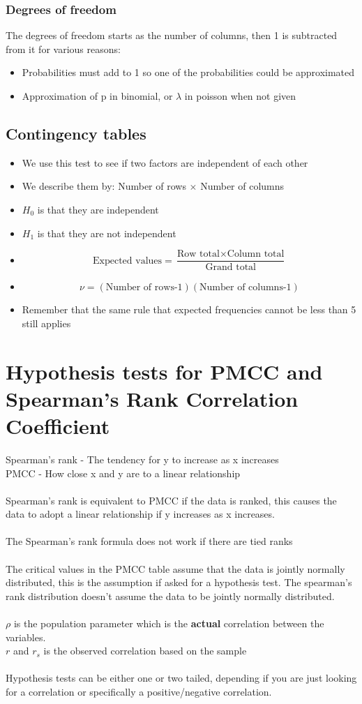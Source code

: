 \documentclass{article}[18pt]
\begin{document}
\subsubsection{Degrees of freedom}
The degrees of freedom starts as the number of columns, then 1 is subtracted from it for various reasons:
\begin{itemize}
\item Probabilities must add to 1 so one of the probabilities could be approximated
\item Approximation of p in binomial, or $\lambda$ in poisson when not given
\end{itemize}
\newpage
\subsection{Contingency tables}
\begin{itemize}
\item We use this test to see if two factors are independent of each other
\item We describe them by: Number of rows $\times$ Number of columns
\item $H_0$ is that they are independent
\item $H_1$ is that they are not independent
\item $$\textrm{Expected values}=\frac{\textrm{Row total}\times\textrm{Column total}}{\textrm{Grand total}}$$
\item $$\nu=(\textrm{Number of rows-1})(\textrm{Number of columns-1})$$
\item Remember that the same rule that expected frequencies cannot be less than 5 still applies
\end{itemize}
\section{Hypothesis tests for PMCC and Spearman's Rank Correlation Coefficient}
Spearman's rank - The tendency for y to increase as x increases\\
PMCC - How close x and y are to a linear relationship\\
\\
Spearman's rank is equivalent to PMCC if the data is ranked, this causes the data to adopt a linear relationship if y increases as x increases.\\
\\
The Spearman's rank formula does not work if there are tied ranks\\
\\
The critical values in the PMCC table assume that the data is jointly normally distributed, this is the assumption if asked for a hypothesis test. The spearman's rank distribution doesn't assume the data to be jointly normally distributed.\\
\\
$\rho$ is the population parameter which is the \textbf{actual} correlation between the variables.\\
$r$ and $r_s$ is the observed correlation based on the sample\\
\\
Hypothesis tests can be either one or two tailed, depending if you are just looking for a correlation or specifically a positive/negative correlation.
\newpage
\end{document}
